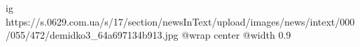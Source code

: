  
 
 
 
 

\ifcmt
  ig https://s.0629.com.ua/s/17/section/newsInText/upload/images/news/intext/000/055/472/demidko3_64a697134b913.jpg
  @wrap center
  @width 0.9
\fi
